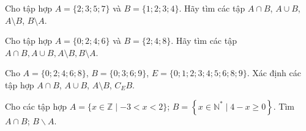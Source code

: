 \begin{bt}%
Cho tập hợp $A=\{2 ; 3 ; 5 ; 7\}$ và $B=\{1 ; 2 ; 3 ; 4\}$. Hãy tìm các tập $A \cap B$, $A \cup B$, $A \setminus B$, $B \setminus A$.
\end{bt}

\begin{bt}%
Cho tập hợp $A=\{0 ; 2 ; 4 ; 6\}$ và $B=\{2 ; 4 ; 8\}$. Hãy tìm các tập $A \cap B, A \cup B, A \setminus B, B \setminus A$.
\end{bt}

\begin{bt}%
	Cho $ A=\{0;2;4;6;8\} $, $ B=\{0;3;6;9\} $, $ E=\{0;1;2;3;4;5;6;8;9\} $. Xác định các tập hợp $ A\cap B $, $ A\cup B $, $ A\setminus B $, $ C_EB $.
\end{bt}

\begin{bt}%
	Cho các tập hợp $A=\{x \in \mathbb{Z} \mid-3<x<2\}$; $B=\left\{x \in \mathbb{N}^* \mid 4-x \geq 0\right\}$. Tìm $A \cap B$; $B\backslash A$.
\end{bt}

